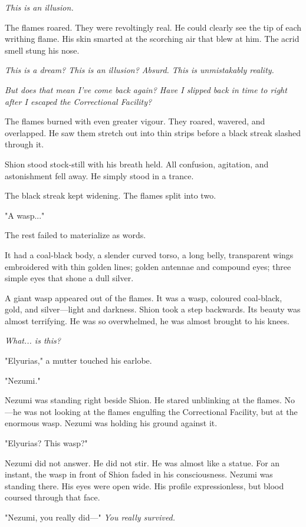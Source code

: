 \emph{This is an illusion.}

The flames roared. They were revoltingly real. He could clearly see the
tip of each writhing flame. His skin smarted at the scorching air that
blew at him. The acrid smell stung his nose.

\emph{This is a dream? This is an illusion? Absurd. This is unmistakably
reality.}

\emph{But does that mean I've come back again? Have I slipped back in time to
right after I escaped the Correctional Facility?}

The flames burned with even greater vigour. They roared, wavered, and
overlapped. He saw them stretch out into thin strips before a black
streak slashed through it.

Shion stood stock-still with his breath held. All confusion, agitation,
and astonishment fell away. He simply stood in a trance.

The black streak kept widening. The flames split into two.

"A wasp..."

The rest failed to materialize as words.

It had a coal-black body, a slender curved torso, a long belly,
transparent wings embroidered with thin golden lines; golden antennae
and compound eyes; three simple eyes that shone a dull silver.

A giant wasp appeared out of the flames. It was a wasp, coloured
coal-black, gold, and silver---light and darkness. Shion took a step
backwards. Its beauty was almost terrifying. He was so overwhelmed, he
was almost brought to his knees.

\emph{What... is this?}

"Elyurias," a mutter touched his earlobe.

"Nezumi."

Nezumi was standing right beside Shion. He stared unblinking at the
flames. No---he was not looking at the flames engulfing the Correctional
Facility, but at the enormous wasp. Nezumi was holding his ground
against it.

"Elyurias? This wasp?"

Nezumi did not answer. He did not stir. He was almost like a statue. For
an instant, the wasp in front of Shion faded in his consciousness.
Nezumi was standing there. His eyes were open wide. His profile
expressionless, but blood coursed through that face.

"Nezumi, you really did---" \emph{You really survived.}

